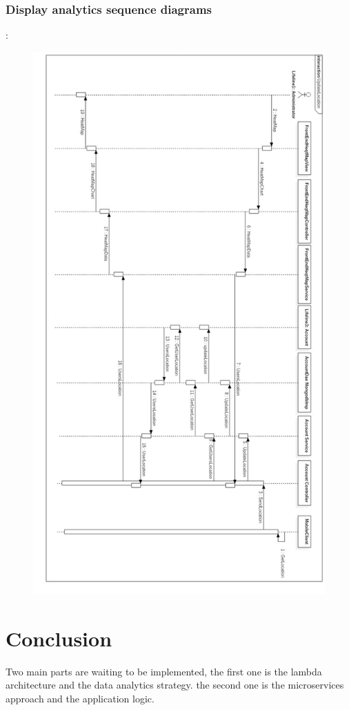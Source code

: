 \begin{figure}[h!]
	\label{fig:FilialesEtClients}
\end{figure}
\newpage
\subsubsection{Display analytics sequence diagrams} :
\begin{figure}[h!]
	\centering
	\includegraphics[height=0.85\textheight]{fig01/UpdateLocation}
	\label{fig:FilialesEtClients}
\end{figure}
\newpage
\section{ Conclusion }
Two main parts are waiting to be implemented, the first one is the lambda architecture and the data analytics strategy. the second one is the microservices approach and the application logic.

